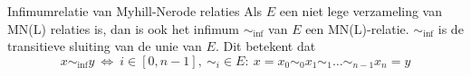 
\begin{lem}{Infimumrelatie van Myhill-Nerode relaties}
    Als $E$ een niet lege verzameling van MN(L) relaties is, dan is ook het infimum $\sim_{\text{inf}}$ van $E$ een MN(L)-relatie.
    $\sim_{\text{inf}}$ is de transitieve sluiting van de unie van $E$. Dit betekent dat
    \begin{equation*}
        x \sim_{\text{inf}} y \ \Leftrightarrow \ i \in [0, n-1], \ \sim_i \in E: \ x = x_0 \sim_0 x_1 \sim_1 \ldots \sim_{n-1} x_n = y
    \end{equation*}
    \vspace{-0.5cm}
\end{lem}

